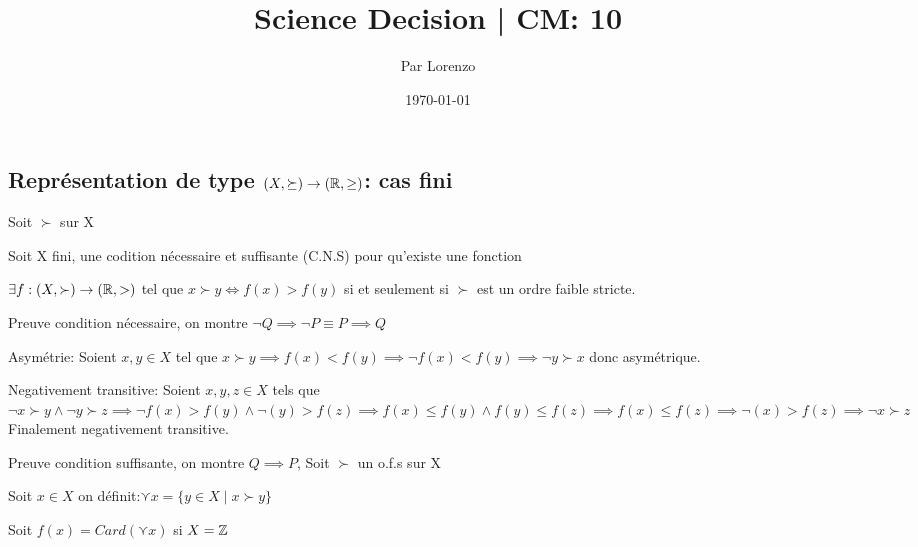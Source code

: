 \documentclass[a4paper, 12pt]{article}
\title{Science Decision | CM: 10}
\author{Par Lorenzo}
\date{\today}
\begin{document}
\maketitle


\subsection{Représentation de type $(X, \succeq) \rightarrow (\mathbb{R}, \geq)$: cas fini}

Soit $\succ$ sur X

\begin{proposition}
    Soit X fini, une codition nécessaire et suffisante (C.N.S) pour qu'existe une fonction

    $\exists f: (X, \succ) \rightarrow (\mathbb{R}, >)$ tel que $x \succ y \iff f(x) \gt f(y)$ si et seulement si $\succ$ est un ordre faible stricte.
\end{proposition}

\begin{demonstration}
    Preuve condition nécessaire, on montre $\neg Q \implies \neg P \equiv P \implies Q$

    \item Asymétrie: Soient $x, y \in X$ tel que $x \succ y \implies f(x) \lt f(y) \implies \neg f(x) \lt f(y) \implies \neg y \succ x$ donc asymétrique.

    \item Negativement transitive: Soient $x, y, z \in X$ tels que $\neg x \succ y \land \neg y \succ z \implies \neg f(x) \gt f(y) \land \neg (y) \gt f(z) \implies f(x) \leq f(y) \land f(y) \leq f(z) \implies f(x) \leq f(z) \implies \neg (x) \gt f(z) \implies \neg x \succ z$
    Finalement negativement transitive.

    Preuve condition suffisante, on montre $Q \implies P$, Soit $\succ$ un o.f.s sur X

    Soit $x \in X$ on définit:$\curlyvee x = \{y \in X \mid x \succ y\}$
    
    Soit $f(x) = Card(\curlyvee x)$ si $X = \mathbb{Z}$
\end{demonstration}
\end{document}
